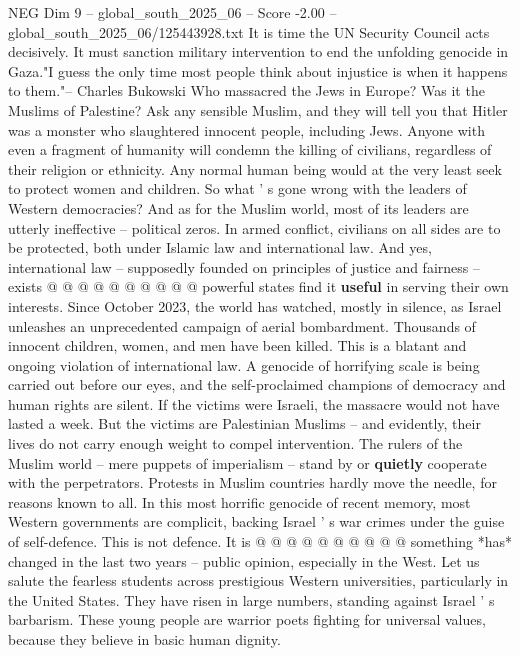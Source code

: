 \begin{textsample}{NEG Dim 9 – global\_south\_2025\_06 – Score -2.00 – global\_south\_2025\_06/125443928.txt}  \label{ex:f9_neg_279}
It is time the UN Security Council acts decisively.
It must sanction military intervention to end the unfolding genocide in Gaza."I guess the only time most people think about injustice is when it happens to them."-- Charles Bukowski Who massacred the Jews in Europe?
Was it the Muslims of Palestine?
Ask any sensible Muslim, and they will tell you that Hitler was a monster who slaughtered innocent people, including Jews.
Anyone with even a fragment of humanity will condemn the killing of civilians, regardless of their religion or ethnicity.
Any normal human being would at the very least seek to protect women and children.
So what ' s gone wrong with the leaders of Western democracies?
And as for the Muslim world, most of its leaders are utterly ineffective -- political zeros.
In armed conflict, civilians on all sides are to be protected, both under Islamic law and international law.
And yes, international law -- supposedly founded on principles of justice and fairness -- exists @ @ @ @ @ @ @ @ @ @ powerful states find it \textbf{useful} in serving their own interests.
Since October 2023, the world has watched, mostly in silence, as Israel unleashes an unprecedented campaign of aerial bombardment.
Thousands of innocent children, women, and men have been killed.
This is a blatant and ongoing violation of international law.
A genocide of horrifying scale is being carried out before our eyes, and the self-proclaimed champions of democracy and human rights are silent.
If the victims were Israeli, the massacre would not have lasted a week.
But the victims are Palestinian Muslims -- and evidently, their lives do not carry enough weight to compel intervention.
The rulers of the Muslim world -- mere puppets of imperialism -- stand by or \textbf{quietly} cooperate with the perpetrators.
Protests in Muslim countries hardly move the needle, for reasons known to all.
In this most horrific genocide of recent memory, most Western governments are complicit, backing Israel ' s war crimes under the guise of self-defence.
This is not defence.
It is @ @ @ @ @ @ @ @ @ @ something *has* changed in the last two years -- public opinion, especially in the West.
Let us salute the fearless students across prestigious Western universities, particularly in the United States.
They have risen in large numbers, standing against Israel ' s barbarism.
These young people are warrior poets fighting for universal values, because they believe in basic human dignity.

\end{textsample}
